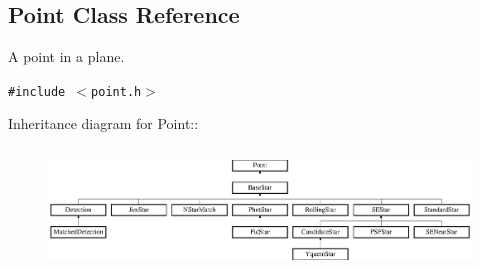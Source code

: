 \subsection{Point  Class Reference}
\label{class_point}
A point in a plane. 


{\tt \#include $<$point.h$>$}

Inheritance diagram for Point::\begin{figure}[H]
\begin{center}
\leavevmode
\includegraphics[height=3.27869cm]{class_point}
\end{center}
\end{figure}
